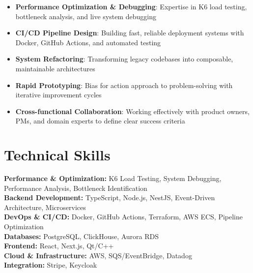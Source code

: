 \documentclass[11pt,a4paper]{article}
\begin{document}
\begin{itemize}
  \item \textbf{Performance Optimization \& Debugging}: Expertise in K6 load testing, bottleneck analysis, and live system debugging
  \item \textbf{CI/CD Pipeline Design}: Building fast, reliable deployment systems with Docker, GitHub Actions, and automated testing
  \item \textbf{System Refactoring}: Transforming legacy codebases into composable, maintainable architectures
  \item \textbf{Rapid Prototyping}: Bias for action approach to problem-solving with iterative improvement cycles
  \item \textbf{Cross-functional Collaboration}: Working effectively with product owners, PMs, and domain experts to define clear success criteria
\end{itemize}

\section{Technical Skills}

\textbf{Performance \& Optimization:} K6 Load Testing, System Debugging, Performance Analysis, Bottleneck Identification\\[0.4em]
\textbf{Backend Development:} TypeScript, Node.js, NestJS, Event-Driven Architecture, Microservices\\[0.4em]
\textbf{DevOps \& CI/CD:} Docker, GitHub Actions, Terraform, AWS ECS, Pipeline Optimization\\[0.4em]
\textbf{Databases:} PostgreSQL, ClickHouse, Aurora RDS\\[0.4em]
\textbf{Frontend:} React, Next.js, Qt/C++\\[0.4em]
\textbf{Cloud \& Infrastructure:} AWS, SQS/EventBridge, Datadog\\[0.4em]
\textbf{Integration:} Stripe, Keycloak
\end{document}

